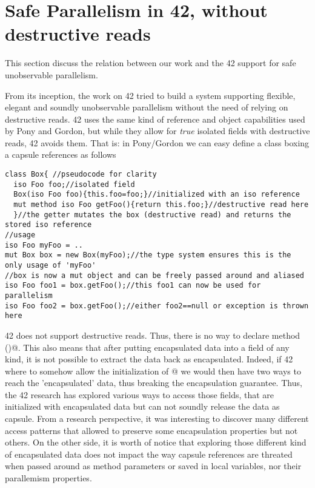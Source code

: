 \section{Safe Parallelism in 42, without destructive reads}
\label{s:parallelism}

This section discuss the relation between our work and the 42 support for safe unobservable parallelism.

From its inception, the work on 42 tried to build a system supporting flexible, elegant and soundly unobservable parallelism without the need of relying on destructive reads.
42 uses  the same kind of reference and object capabilities used by Pony and Gordon, but while they allow for \emph{true} isolated fields with destructive reads, 42 avoids them.
That is: in Pony/Gordon we can easy define a class boxing a capsule references as follows
\begin{lstlisting}[morekeywords={iso}]
class Box{ //pseudocode for clarity
  iso Foo foo;//isolated field
  Box(iso Foo foo){this.foo=foo;}//initialized with an iso reference
  mut method iso Foo getFoo(){return this.foo;}//destructive read here
  }//the getter mutates the box (destructive read) and returns the stored iso reference
//usage
iso Foo myFoo = ..
mut Box box = new Box(myFoo);//the type system ensures this is the only usage of 'myFoo'
//box is now a mut object and can be freely passed around and aliased
iso Foo foo1 = box.getFoo();//this foo1 can now be used for parallelism
iso Foo foo2 = box.getFoo();//either foo2==null or exception is thrown here
\end{lstlisting}
42 does not support destructive reads. Thus, there is no way to declare method \Q@getFoo()@.
This also means that after putting encapsulated data into a field of any kind, it is not possible to extract the data back as encapsulated.
Indeed, if 42 where to somehow allow the initialization of @ we would then have two ways to reach the 'encapsulated' data, thus breaking the encapsulation guarantee.
Thus, the 42 research has explored various ways to access those fields, that are initialized with encapsulated data but can not soundly release the data as capsule.
From a research perspective, it was interesting to discover many different access patterns that allowed to preserve some encapsulation properties but not others.
On the other side, it is worth of notice that exploring those different kind of encapsulated data does not impact the way capsule references are threated when passed around as method parameters or saved in local variables, nor their parallemism properties.

